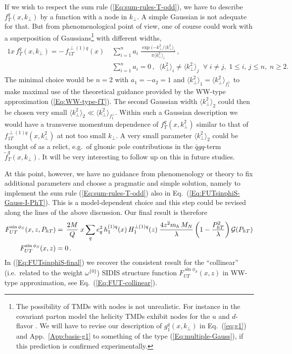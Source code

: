 \documentclass[a4paper,11pt]{article}
\newcommand{\la}{\langle}
\newcommand{\ra}{\rangle}
\def\Phperp{P_{hT}}
\def\kperp{k_\perp}
\begin{document}
If we wish to respect the sum rule (\ref{Eq:sum-rules-T-odd}), 
we have to describe $f_T^q(x,\kperp)$ by a function with a node 
in $\kperp$. A simple Gaussian is not adequate for that. But from
phenomenological point of view, one of course could work with a 
superposition of Gaussians\footnote{
	The possibility of TMDs with nodes is not unrealistic.
	For instance in the covariant parton model the helicity TMDs 
	exhibit nodes for the $u$ and $d$- flavor \cite{Efremov:2010mt}.
	We will have to revise our description of $g_1^q(x,\kperp)$ 
	in Eq.~(\ref{eq:g1}) and App.~\ref{App:basis-g1} to something 
	of the type (\ref{Eq:multiple-Gauss}), if this prediction is 
	confirmed experimentally. }
with different widths, 
\begin{alignat}{1}
	x \, f_T^q(x,\kperp) =  - \, f_{1T}^{\perp (1)q}(x)\;
	&\sum\limits_{i=1}^{n} a_i\;
	\frac{\exp(-\kperp^2/\la\kperp^2\ra_i^{ }}{\pi\la\kperp^2\ra_i^{ }}\,,
	\nonumber\\
	&\sum\limits_{i=1}^n a_i = 0\,, \;\;
	\la\kperp^2\ra_i^{ }\neq\la\kperp^2\ra_j^{ }\;\;\forall\;i\neq j,
	\; 1\le i,\,j\le n,\;n\ge 2.\label{Eq:multiple-Gauss}
\end{alignat}
The minimal choice would be $n=2$ with $a_1=-a_2=1$ and
$\la\kperp^2\ra_1^{ } = \la\kperp^2\ra_{f_1^\perp}$ to make maximal use 
of the theoretical guidance provided by the WW-type approximation 
(\ref{Eq:WW-type-fT}). 
The second Gaussian width $\la\kperp^2\ra_2^{ }$ could then be chosen
very small $\la\kperp^2\ra_2^{ } \ll \la\kperp^2\ra_{f_1^\perp}$.
Within such a Gaussian description we would have a transverse momentum 
dependence of $f_T^{q}(x,\kperp^2)$ similar to that of 
$f_{1T}^{\perp(1)q}(x,\kperp^2)$ at not too small $\kperp$. 
A very small parameter $\la\kperp^2\ra_2^{ }$ could be thought of as 
a relict, e.g.\ of gluonic pole contributions in the $\bar qgq$-term 
$\tilde{f}_T^q(x,\kperp)$. It will be very interesting to follow up
on this in future studies.

At this point, however, we have no guidance from phenomenology or theory 
to fix additional parameters and choose a pragmatic and simple solution, 
namely to implement the sum rule (\ref{Eq:sum-rules-T-odd}) also in 
Eq.~(\ref{Eq:FUTsinphiS-Gauss-I-PhT}). This is
a model-dependent choice and this step could be revised along the
lines of the above discussion. Our final result is therefore
\begin{alignat}{1}
	F_{UT}^{\sin\phi_S}(x,z,\Phperp) 
	&= \,\frac{2M}{Q}\;x\sum_q e_q^2\,
	h_1^{(1)q}(x)\,H_1^{\perp(1)q}(z)\; \frac{4z^2 m_h\,M_N}{\lambda} 
	\left(1-\frac{\Phperp^2}{\lambda}\right) {\cal G}(\Phperp) 
	\nonumber\\
  	F_{UT}^{\sin\phi_S}(x,z) 
	&= 0 \, .	\label{Eq:FUTsinphiS-final}
\end{alignat}
In (\ref{Eq:FUTsinphiS-final}) we recover the consistent result for 
the ``collinear'' (i.e.\ related to the weight $\omega^{\{0\}}$) SIDIS 
structure function $F_{UT}^{\sin\phi_S}(x,z)$ in WW-type approximation, 
see Eq.~(\ref{Eq:FUT-collinear}). 
\end{document}
